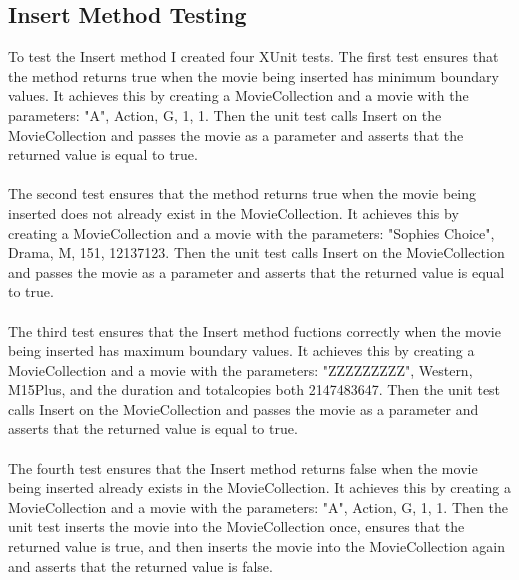 \documentclass[12pt,a4paper]{article}
\begin{document}
		\newpage

 		\subsection{Insert Method Testing}
			To test the Insert method I created four XUnit tests. The first test 
			ensures that the method returns true when the movie being inserted has 
			minimum boundary values. It achieves this by creating a MovieCollection 
			and a movie with the parameters: "A", Action, G, 1, 1. Then the unit 
			test calls Insert on the MovieCollection and passes the movie as a 
			parameter and asserts that the returned value is equal to true.\\
			\\
			The second test ensures that the method returns true when the movie 
			being inserted does not already exist in the MovieCollection. It 
			achieves this by creating a MovieCollection and a movie with the 
			parameters: "Sophies Choice", Drama, M, 151, 12137123. Then the unit 
			test calls Insert on the MovieCollection and passes the movie as a 
			parameter and asserts that the returned value is equal to true.\\
			\\
			The third test ensures that the Insert method fuctions correctly when 
			the movie being inserted has maximum boundary values. It achieves this 
			by creating a MovieCollection and a movie with the parameters: "ZZZZZZZZZ", 
			Western, M15Plus, and the duration and totalcopies both 2147483647. Then 
			the unit test calls Insert on the MovieCollection and passes the movie 
			as a parameter and asserts that the returned value is equal to true.\\
			\\
			The fourth test ensures that the Insert method returns false when the 
			movie being inserted already exists in the MovieCollection. It achieves 
			this by creating a MovieCollection and a movie with the parameters: 
			"A", Action, G, 1, 1. Then the unit test inserts the movie into the 
			MovieCollection once, ensures that the returned value is true, and 
			then inserts the movie into the MovieCollection again and asserts 
			that the returned value is false.\\
\end{document}
